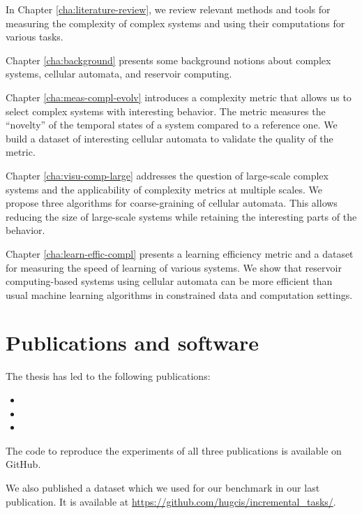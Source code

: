 In Chapter \ref{cha:literature-review}, we review relevant methods and tools for
measuring the complexity of complex systems and using their computations for
various tasks.

Chapter \ref{cha:background} presents some background notions about complex
systems, cellular automata, and reservoir computing.

Chapter \ref{cha:meas-compl-evolv} introduces a complexity metric that allows us 
to select complex systems with interesting behavior. The metric measures the
``novelty'' of the temporal states of a system compared to a reference one. We
build a dataset of interesting cellular automata to validate the quality of the
metric.

Chapter \ref{cha:visu-comp-large} addresses the question of large-scale complex
systems and the applicability of complexity metrics at multiple scales. We
propose three algorithms for coarse-graining of cellular automata. This allows
reducing the size of large-scale systems while retaining the interesting parts
of the behavior.

Chapter \ref{cha:learn-effic-compl} presents a learning efficiency metric and a
dataset for measuring the speed of learning of various systems. We show that
reservoir computing-based systems using cellular automata can be more efficient
than usual machine learning algorithms in constrained data and computation
settings.


\section{Publications and software}

The thesis has led to the following publications:

\begin{itemize}
  \item {}
  \item {}
  \item {}
\end{itemize}

The code to reproduce the experiments of all three publications is available on
GitHub.

We also published a dataset which we used for our benchmark in our last
publication. It is available at
\url{https://github.com/hugcis/incremental_tasks/}.
